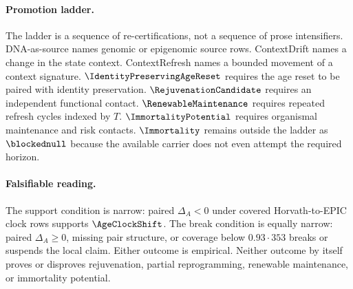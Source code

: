 \paragraph{Promotion ladder.}
The ladder is a sequence of re-certifications, not a sequence of prose intensifiers. DNA-as-source names genomic or epigenomic source rows. ContextDrift names a change in the state context. ContextRefresh names a bounded movement of a context signature. $\IdentityPreservingAgeReset$ requires the age reset to be paired with identity preservation. $\RejuvenationCandidate$ requires an independent functional contact. $\RenewableMaintenance$ requires repeated refresh cycles indexed by $T$. $\ImmortalityPotential$ requires organismal maintenance and risk contacts. $\Immortality$ remains outside the ladder as $\blockednull$ because the available carrier does not even attempt the required horizon.

\paragraph{Falsifiable reading.}
The support condition is narrow: paired $\Delta_A<0$ under covered Horvath-to-EPIC clock rows supports $\AgeClockShift$. The break condition is equally narrow: paired $\Delta_A\geq 0$, missing pair structure, or coverage below $0.93\cdot 353$ breaks or suspends the local claim. Either outcome is empirical. Neither outcome by itself proves or disproves rejuvenation, partial reprogramming, renewable maintenance, or immortality potential.

